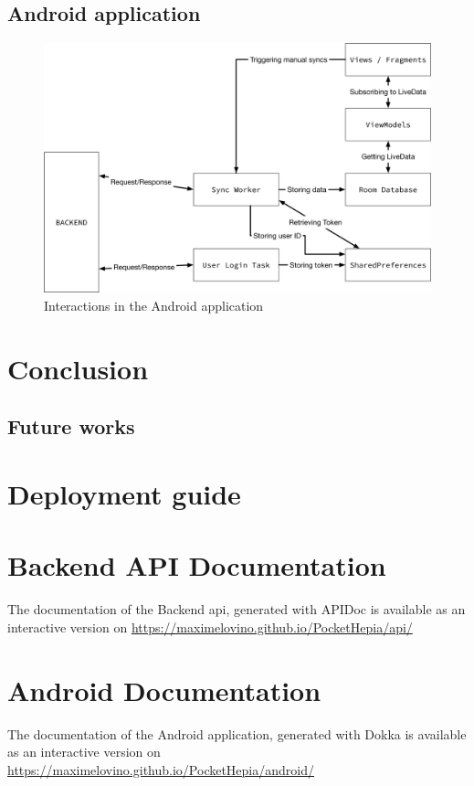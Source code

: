 \documentclass[twoside, openright,11pt,a4paper]{book}
\begin{document}
\section{Android application}
\begin{figure}[H]
\begin{center}
	\includegraphics[width=\textwidth]{assets/android_implementation}
	\caption{Interactions in the Android application}
\end{center}
\end{figure}
\chapter{Conclusion}
\section{Future works}
\backmatter
{}
\pagestyle{plain}


\begin{appendices}
\appendixpage
\chapter{Deployment guide}
\chapter{Backend API Documentation}
\label{appendix_api_doc}
The documentation of the Backend \gls{api}, generated with APIDoc is available as an interactive version on \url{https://maximelovino.github.io/PocketHepia/api/}
\chapter{Android Documentation}
The documentation of the Android application, generated with Dokka is available as an interactive version on \url{https://maximelovino.github.io/PocketHepia/android/}
\end{appendices}
\end{document}
